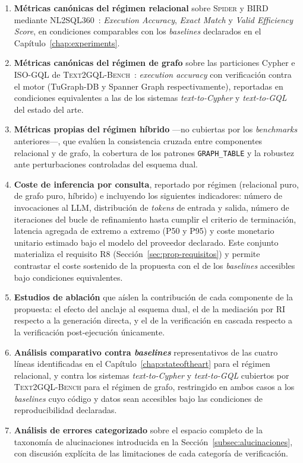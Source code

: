 \begin{enumerate}
    \item \textbf{Métricas canónicas del régimen relacional} sobre \textsc{Spider} y \textsc{BIRD} mediante \textsc{NL2SQL360}~\cite{SuperSQL2024}: \emph{Execution Accuracy}, \emph{Exact Match} y \emph{Valid Efficiency Score}, en condiciones comparables con los \emph{baselines} declarados en el Capítulo~\ref{chap:experiments}.
    \item \textbf{Métricas canónicas del régimen de grafo} sobre las particiones Cypher e ISO-GQL de \textsc{Text2GQL-Bench}~\cite{text2gqlbench}: \emph{execution accuracy} con verificación contra el motor (TuGraph-DB y Spanner Graph respectivamente), reportadas en condiciones equivalentes a las de los sistemas \emph{text-to-Cypher} y \emph{text-to-GQL} del estado del arte.
    \item \textbf{Métricas propias del régimen híbrido} ---no cubiertas por los \emph{benchmarks} anteriores---, que evalúen la consistencia cruzada entre componentes relacional y de grafo, la cobertura de los patrones \texttt{GRAPH\_TABLE} y la robustez ante perturbaciones controladas del esquema dual.
    \item \textbf{Coste de inferencia por consulta}, reportado por régimen (relacional puro, de grafo puro, híbrido) e incluyendo los siguientes indicadores: número de invocaciones al \ac{LLM}, distribución de \emph{tokens} de entrada y salida, número de iteraciones del bucle de refinamiento hasta cumplir el criterio de terminación, latencia agregada de extremo a extremo (P50 y P95) y coste monetario unitario estimado bajo el modelo del proveedor declarado. Este conjunto materializa el requisito R8 (Sección~\ref{sec:prop-requisitos}) y permite contrastar el coste sostenido de la propuesta con el de los \emph{baselines} accesibles bajo condiciones equivalentes. %
    \item \textbf{Estudios de ablación} que aíslen la contribución de cada componente de la propuesta: el efecto del anclaje al esquema dual, el de la mediación por \ac{RI} respecto a la generación directa, y el de la verificación en cascada respecto a la verificación post-ejecución únicamente.
    \item \textbf{Análisis comparativo contra \emph{baselines}} representativos de las cuatro líneas identificadas en el Capítulo~\ref{chap:stateoftheart} para el régimen relacional, y contra los sistemas \emph{text-to-Cypher} y \emph{text-to-GQL} cubiertos por \textsc{Text2GQL-Bench} para el régimen de grafo, restringido en ambos casos a los \emph{baselines} cuyo código y datos sean accesibles bajo las condiciones de reproducibilidad declaradas.
    \item \textbf{Análisis de errores categorizado} sobre el espacio completo de la taxonomía de alucinaciones introducida en la Sección~\ref{subsec:alucinaciones}, con discusión explícita de las limitaciones de cada categoría de verificación.
\end{enumerate}

